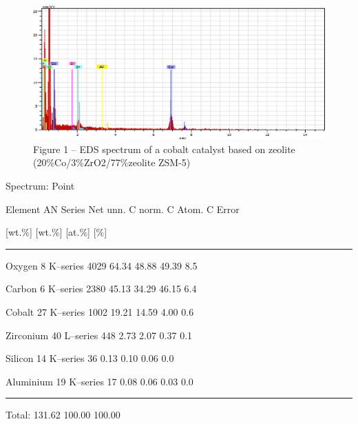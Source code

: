 \begin{figure}[H]
	\centering
	\includegraphics[width=\textwidth]{assets/1076}
  \caption*{Figure 1 -- EDS spectrum of a cobalt catalyst based on zeolite (20\%Co/3\%ZrO2/77\%zeolite ZSM-5)}
\end{figure}

Spectrum: Point

Element AN Series Net unn. C norm. C Atom. C Error

{[}wt.\%{]} {[}wt.\%{]} {[}at.\%{]} {[}\%{]}
\vspace{1em}
\hrule
\vspace{1em}

Oxygen 8 K--series 4029 64.34 48.88 49.39 8.5

Carbon 6 K--series 2380 45.13 34.29 46.15 6.4

Cobalt 27 K--series 1002 19.21 14.59 4.00 0.6

Zirconium 40 L--series 448 2.73 2.07 0.37 0.1

Silicon 14 K--series 36 0.13 0.10 0.06 0.0

Aluminium 19 K--series 17 0.08 0.06 0.03 0.0

\vspace{1em}
\hrule
\vspace{1em}

\hfill Total: 131.62 100.00 100.00

